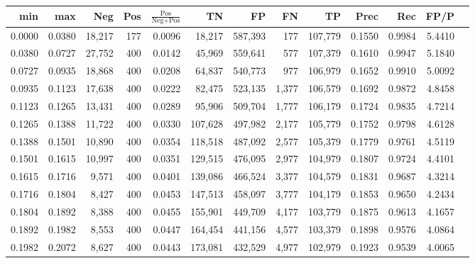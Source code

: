 \begin{tabular}{rrrrrrrrrrrrr}
\toprule
   min &    max &    Neg &   Pos & $\frac{\text{Pos}}{\text{Neg}+\text{Pos}}$ &      TN &      FP &      FN &      TP &   Prec &    Rec &   FP/P \\
\midrule
0.0000 & 0.0380 & 18,217 &   177 &                                     0.0096 &  18,217 & 587,393 &     177 & 107,779 & 0.1550 & 0.9984 & 5.4410 \\
0.0380 & 0.0727 & 27,752 &   400 &                                     0.0142 &  45,969 & 559,641 &     577 & 107,379 & 0.1610 & 0.9947 & 5.1840 \\
0.0727 & 0.0935 & 18,868 &   400 &                                     0.0208 &  64,837 & 540,773 &     977 & 106,979 & 0.1652 & 0.9910 & 5.0092 \\
0.0935 & 0.1123 & 17,638 &   400 &                                     0.0222 &  82,475 & 523,135 &   1,377 & 106,579 & 0.1692 & 0.9872 & 4.8458 \\
0.1123 & 0.1265 & 13,431 &   400 &                                     0.0289 &  95,906 & 509,704 &   1,777 & 106,179 & 0.1724 & 0.9835 & 4.7214 \\
0.1265 & 0.1388 & 11,722 &   400 &                                     0.0330 & 107,628 & 497,982 &   2,177 & 105,779 & 0.1752 & 0.9798 & 4.6128 \\
0.1388 & 0.1501 & 10,890 &   400 &                                     0.0354 & 118,518 & 487,092 &   2,577 & 105,379 & 0.1779 & 0.9761 & 4.5119 \\
0.1501 & 0.1615 & 10,997 &   400 &                                     0.0351 & 129,515 & 476,095 &   2,977 & 104,979 & 0.1807 & 0.9724 & 4.4101 \\
0.1615 & 0.1716 &  9,571 &   400 &                                     0.0401 & 139,086 & 466,524 &   3,377 & 104,579 & 0.1831 & 0.9687 & 4.3214 \\
0.1716 & 0.1804 &  8,427 &   400 &                                     0.0453 & 147,513 & 458,097 &   3,777 & 104,179 & 0.1853 & 0.9650 & 4.2434 \\
0.1804 & 0.1892 &  8,388 &   400 &                                     0.0455 & 155,901 & 449,709 &   4,177 & 103,779 & 0.1875 & 0.9613 & 4.1657 \\
0.1892 & 0.1982 &  8,553 &   400 &                                     0.0447 & 164,454 & 441,156 &   4,577 & 103,379 & 0.1898 & 0.9576 & 4.0864 \\
0.1982 & 0.2072 &  8,627 &   400 &                                     0.0443 & 173,081 & 432,529 &   4,977 & 102,979 & 0.1923 & 0.9539 & 4.0065 \\

\end{tabular}

